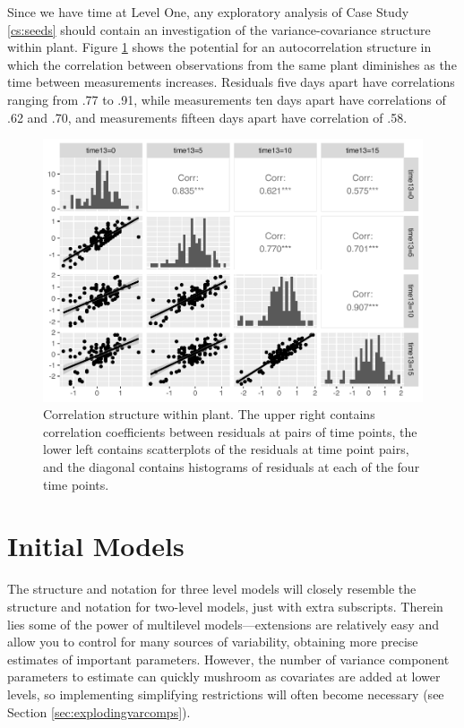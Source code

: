 \documentclass[
]{krantz}
\begin{document}
Since we have time at Level One, any exploratory analysis of Case Study \ref{cs:seeds} should contain an investigation of the variance-covariance structure within plant. Figure \ref{fig:corrstruct} shows the potential for an autocorrelation structure in which the correlation between observations from the same plant diminishes as the time between measurements increases. Residuals five days apart have correlations ranging from .77 to .91, while measurements ten days apart have correlations of .62 and .70, and measurements fifteen days apart have correlation of .58.

\begin{figure}

{\centering \includegraphics[width=0.6\linewidth]{bookdown-BeyondMLR_files/figure-latex/corrstruct-1} 

}

\caption{Correlation structure within plant.  The upper right contains correlation coefficients between residuals at pairs of time points, the lower left contains scatterplots of the residuals at time point pairs, and the diagonal contains histograms of residuals at each of the four time points.}\label{fig:corrstruct}
\end{figure}

\hypertarget{initialmodels-3level}{%
\section{Initial Models}\label{initialmodels-3level}}

The structure and notation for three level models will closely resemble the structure and notation for two-level models, just with extra subscripts. Therein lies some of the power of multilevel models---extensions are relatively easy and allow you to control for many sources of variability, obtaining more precise estimates of important parameters. However, the number of variance component parameters to estimate can quickly mushroom as covariates are added at lower levels, so implementing simplifying restrictions will often become necessary (see Section \ref{sec:explodingvarcomps}).
\end{document}
